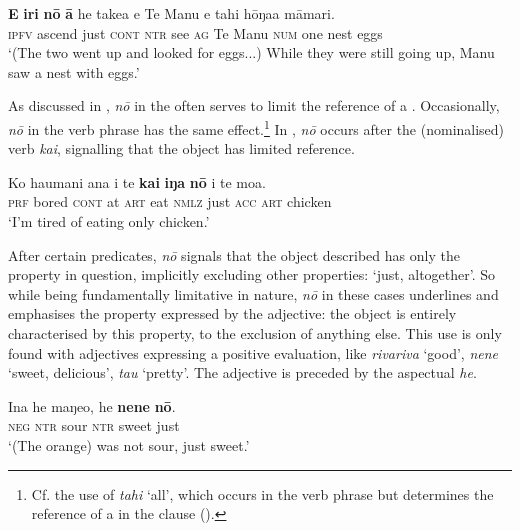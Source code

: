 \ea\label{ex:7.110}
\gll \textbf{E} \textbf{iri} \textbf{nō} \textbf{{\ꞌ}ā} he take{\ꞌ}a e Te Manu e tahi hōŋa{\ꞌ}a māmari.\\
\textsc{ipfv} ascend just \textsc{cont} \textsc{ntr} see \textsc{ag} Te Manu \textsc{num} one nest eggs\\

\glt
‘(The two went up and looked for eggs...) While they were still going up, Manu saw a nest with eggs.’ \textstyleExampleref{[R245.202–203]}
\z

As discussed in , \textit{nō} in the  often serves to limit the reference of a . Occasionally, \textit{nō} in the verb phrase has the same effect.\footnote{\label{fn:347}Cf. the use of \textit{tahi} ‘all’, which occurs in the verb phrase but determines the reference of a  in the clause ().} In , \textit{nō} occurs after the (nominalised) verb \textit{kai}, signalling that the object  has limited reference.

\ea\label{ex:7.111}
\gll Ko ha{\ꞌ}umani {\ꞌ}ana {\ꞌ}i te \textbf{kai} \textbf{iŋa} \textbf{nō} i te moa. \\
\textsc{prf} bored \textsc{cont} at \textsc{art} eat \textsc{nmlz} just \textsc{acc} \textsc{art} chicken \\

\glt 
‘I’m tired of eating only chicken.’ \textstyleExampleref{[R229.123]} 
\z

\largerpage
After certain  predicates, \textit{nō} signals that the object described has only the property in question, implicitly excluding other properties: ‘just, altogether’. So while being fundamentally limitative in nature, \textit{nō} in these cases underlines and emphasises the property expressed by the adjective: the object is entirely characterised by this property, to the exclusion of anything else. This use is only found with adjectives expressing a positive evaluation, like \textit{rivariva} ‘good’, \textit{nene} ‘sweet, delicious’, \textit{tau} ‘pretty’. The adjective is preceded by the aspectual \textit{he}.

\ea\label{ex:7.112}
\gll {\ꞌ}Ina he maŋeo, he \textbf{nene} \textbf{nō}. \\
\textsc{neg} \textsc{ntr} sour \textsc{ntr} sweet just \\

\glt 
‘(The orange) was not sour, just sweet.’ \textstyleExampleref{[Egt-02.135]}
\z

